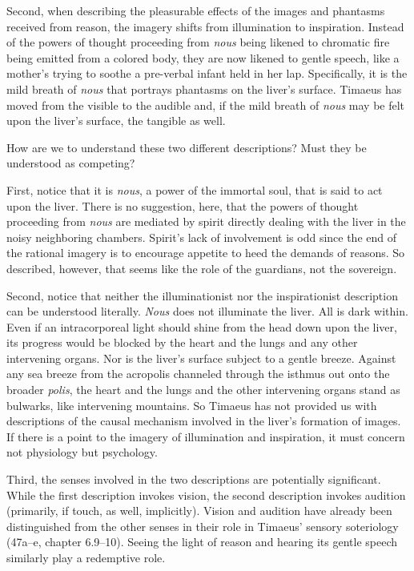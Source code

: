 Second, when describing the pleasurable effects of the images and phantasms received from reason, the imagery shifts from illumination to inspiration. Instead of the powers of thought proceeding from \emph{nous} being likened to chromatic fire being emitted from a colored body, they are now likened to gentle speech, like a mother's trying to soothe a pre-verbal infant held in her lap. Specifically, it is the mild breath of \emph{nous} that portrays phantasms on the liver's surface. Timaeus has moved from the visible to the audible and, if the mild breath of \emph{nous} may be felt upon the liver's surface, the tangible as well. 

How are we to understand these two different descriptions? Must they be understood as competing?

First, notice that it is \emph{nous}, a power of the immortal soul, that is said to act upon the liver. There is no suggestion, here, that the powers of thought proceeding from \emph{nous} are mediated by spirit directly dealing with the liver in the noisy neighboring chambers. Spirit's lack of involvement is odd since the end of the rational imagery is to encourage appetite to heed the demands of reasons. So described, however, that seems like the role of the guardians, not the sovereign. 

Second, notice that neither the illuminationist nor the inspirationist description can be understood literally. \emph{Nous} does not illuminate the liver. All is dark within. Even if an intracorporeal light should shine from the head down upon the liver, its progress would be blocked by the heart and the lungs and any other intervening organs. Nor is the liver's surface subject to a gentle breeze. Against any sea breeze from the acropolis channeled through the isthmus out onto the broader \emph{polis}, the heart and the lungs and the other intervening organs stand as bulwarks, like intervening mountains. So Timaeus has not provided us with descriptions of the causal mechanism involved in the liver's formation of images. If there is a point to the imagery of illumination and inspiration, it must concern not physiology but psychology. 

Third, the senses involved in the two descriptions are potentially significant. While the first description invokes vision, the second description invokes audition (primarily, if touch, as well, implicitly). Vision and audition have already been distinguished from the other senses in their role in Timaeus' sensory soteriology (47a--e, chapter 6.9--10). Seeing the light of reason and hearing its gentle speech similarly play a redemptive role.


